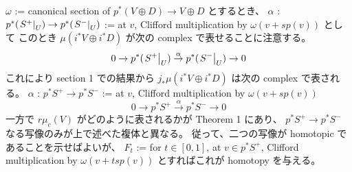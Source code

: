 \begin{Proof}
\itemprof
  \(\omega\) := canonical section of \(p^*(V \oplus D) \to V \oplus D\) とするとき、
  \(\alpha\) : \(p^*(\left. {S^{+}} \right| _{U}) \to p^*(\left. {S^{-}} \right| _{U})\) := at \(v\), Clifford multiplication by \(\omega (v + s p(v))\) として
  このとき \(\mu({i^*} V \oplus {i^*} D)\) が次の complex で表せることに注意する。
  \[
    0 \to {p^*} (\left. {S^{+}} \right| _{U}) \overset{\alpha}{\to} {p^*} (\left. {S^{-}} \right| _{U}) \to 0
  \]
  これにより section 1 での結果から \({j_*} \mu({i^*} V \oplus {i^*} D)\) は次の complex で表される。
  \(\alpha\) : \({p^*} S^{+} \to {p^*} S^{-}\) := at \(v\), Clifford multiplication by \(\omega (v + s p (v))\) 
  \[
    0 \to {p^*} S^{+} \overset{\alpha}{\to} {p^*} S^{-} \to 0
  \]
  一方で \(r \mu_c (V)\) がどのように表されるかが Theorem 1 にあり、 \({p^*} S^{+} \to {p^*} S^{-}\) なる写像のみが上で述べた複体と異なる。
  従って、二つの写像が homotopic であることを示せばよいが、
  \(F_t\) := for \(t \in [0,1]\), at \(v \in {p^*} S^{+}\), Clifford multiplication by \(\omega (v + t s p(v))\) とすればこれが homotopy を与える。
\end{Proof}
